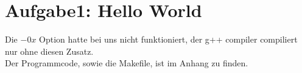 \newpage
\section{Aufgabe1: Hello World}
\label{sec:auf1}

Die $-0x$ Option hatte bei uns nicht funktioniert, der g++ compiler compiliert nur ohne diesen Zusatz.\\
Der Programmcode, sowie die Makefile, ist im Anhang zu finden.